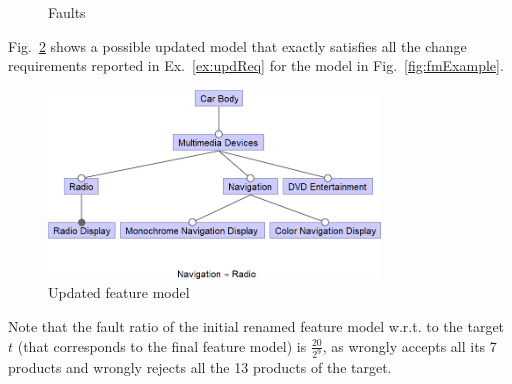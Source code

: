 \begin{tikzborder}{\cite{Gargantini16:validation}}
\begin{tikzborder}{\cite{gargantini_combinatorial_2017}}
\begin{tikzborder}{\cite{garn2019}}
\begin{tikzborder}{\cite{arcaini2019achieving}}
	\begin{figure}[h]
		\def\languageAll{(-1.2,-1.2) rectangle (2.2cm,1.2cm)}
		\def\firstcircle{(0,0) circle (1cm)}
		\def\circleS{(0:1cm) circle (1cm)}
		\centering
		\caption{Faults}
		\label{fig:faults}
	\end{figure}
	
	\begin{exmp}
		\bb Fig.~\ref{fig:exampleUpdatedFM} shows a possible updated model that exactly satisfies all the change requirements reported in Ex.~\ref{ex:updReq} for the model in Fig.~\ref{fig:fmExample}.\be 
		\begin{figure}[htb!]
			\centering
			\includegraphics[height=5cm]{car2011_4paper}
			\caption{Updated feature model}
			\label{fig:exampleUpdatedFM}
		\end{figure}
		\bb Note that the fault ratio of the initial renamed feature model \initFm w.r.t. to the target $t$ (that corresponds to the final feature model) is $\frac{20}{2^9}$, as \initFm wrongly accepts all its 7 products and wrongly rejects all the 13 products of the target.\be
	\end{exmp}
	

\end{tikzborder}
\end{tikzborder}
\end{tikzborder}
\end{tikzborder}
